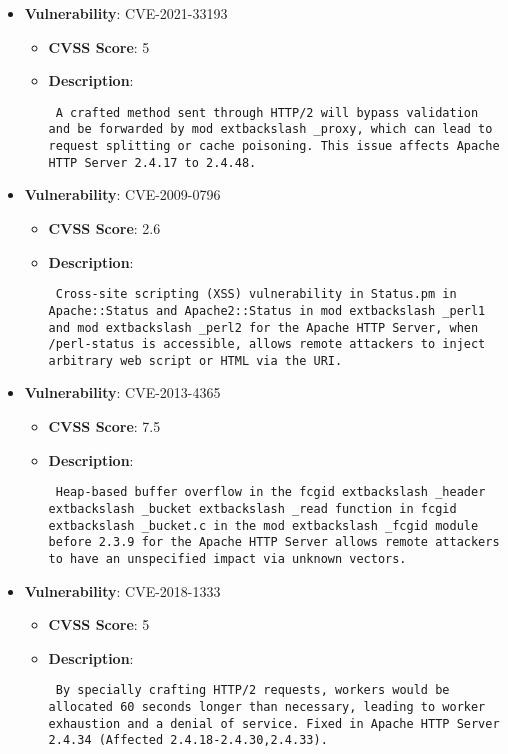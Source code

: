\documentclass{article}
\begin{document}
\begin{itemize}
        \item \textbf{Vulnerability}: CVE-2021-33193
        \begin{itemize}
            \item \textbf{CVSS Score}:  5 
            \item \textbf{Description}: \parbox{\linewidth}{\texttt{ A crafted method sent through HTTP/2 will bypass validation and be forwarded by mod	extbackslash _proxy, which can lead to request splitting or cache poisoning. This issue affects Apache HTTP Server 2.4.17 to 2.4.48. }}
        \end{itemize}
    
        \item \textbf{Vulnerability}: CVE-2009-0796
        \begin{itemize}
            \item \textbf{CVSS Score}:  2.6 
            \item \textbf{Description}: \parbox{\linewidth}{\texttt{ Cross-site scripting (XSS) vulnerability in Status.pm in Apache::Status and Apache2::Status in mod	extbackslash _perl1 and mod	extbackslash _perl2 for the Apache HTTP Server, when /perl-status is accessible, allows remote attackers to inject arbitrary web script or HTML via the URI. }}
        \end{itemize}
    
        \item \textbf{Vulnerability}: CVE-2013-4365
        \begin{itemize}
            \item \textbf{CVSS Score}:  7.5 
            \item \textbf{Description}: \parbox{\linewidth}{\texttt{ Heap-based buffer overflow in the fcgid	extbackslash _header	extbackslash _bucket	extbackslash _read function in fcgid	extbackslash _bucket.c in the mod	extbackslash _fcgid module before 2.3.9 for the Apache HTTP Server allows remote attackers to have an unspecified impact via unknown vectors. }}
        \end{itemize}
    
        \item \textbf{Vulnerability}: CVE-2018-1333
        \begin{itemize}
            \item \textbf{CVSS Score}:  5 
            \item \textbf{Description}: \parbox{\linewidth}{\texttt{ By specially crafting HTTP/2 requests, workers would be allocated 60 seconds longer than necessary, leading to worker exhaustion and a denial of service. Fixed in Apache HTTP Server 2.4.34 (Affected 2.4.18-2.4.30,2.4.33). }}
        \end{itemize}
    

\end{itemize}
\end{document}
